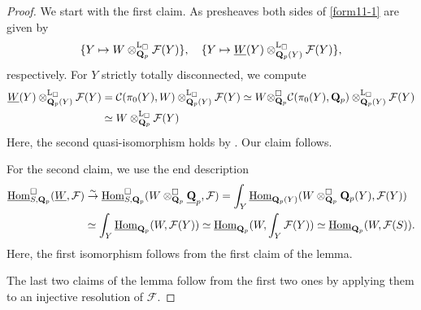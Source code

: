 \documentclass[10pt]{amsart}
\theoremstyle{definition}
\theoremstyle{remark}
\newcommand{\uHom}{\underline{{\rm{Hom}} }}
\newcommand{\LL}{\operatorname{L} }
\newcommand{\sff}{{\mathcal{F}}}
\newcommand{\scc}{{\mathcal{C}}}
\numberwithin{equation}{section}
\def\Q{{\bf Q}} \def\Z{{\bf Z}}
\numberwithin{equation}{section}
\begin{document}
\begin{proof}  We start with the first claim. As presheaves both sides of \eqref{form11-1} are given by 
  \begin{align*}
  \{Y\mapsto W\otimes^{\LL_{\Box}}_{\Q_{p}}\sff(Y)\},\quad 
    \{Y\mapsto \underline{W}(Y)\otimes^{\LL_{\Box}}_{\Q_{p}(Y)}\sff(Y)\},
  \end{align*}
  respectively. 
  For $Y$ strictly totally disconnected,  we compute 
  \begin{align*}
  \underline{W}(Y)\otimes^{\LL_{\Box}}_{\Q_{p}(Y)}\sff(Y) & =\scc(\pi_0(Y),W)\otimes^{\LL_{\Box}}_{\Q_{p}(Y)}\sff(Y)\simeq W{\otimes}^{{\Box}}_{\Q_{p}}\scc(\pi_0(Y),\Q_p)\otimes^{\LL_{\Box}}_{\Q_{p}(Y)}\sff(Y)\\
  &  \simeq W\otimes^{\LL_{\Box}}_{\Q_{p}}\sff(Y)
  \end{align*}
   Here, the second quasi-isomorphism holds by \cite[Cor. 10.5.4]{PGS}. Our claim follows.
  
  For the second claim, we use the  end description
  \begin{align*}
  \uHom^{\Box}_{S,\Q_p}(\underline{W} ,\sff)  & \stackrel{\sim}{\to}  \uHom^{\Box}_{S,\Q_p}({W} \otimes^{\Box}_{\Q_{p}}\underline{\Q}_p,\sff)  = \int_{Y}  \uHom_{\Q_p(Y)}(W\otimes^{\Box}_{\Q_{p}}\Q_p(Y) ,\sff(Y))\\
   & \simeq \int_{Y} \uHom_{\Q_p}(W ,\sff(Y))\simeq  \uHom_{\Q_p}(W ,\int_{Y} \sff(Y))\simeq  \uHom_{\Q_p} (W,\sff(S)).
  \end{align*}
  Here, the first isomorphism follows from the first claim of the lemma. 
  
  The last two claims  of the lemma follow from the first two ones by applying  them  to an injective resolution of $\sff$. 
\end{proof}
\end{document}
